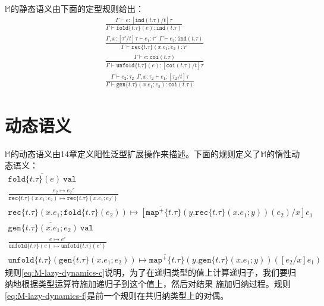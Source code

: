 $\mathbb{M}$的静态语义由下面的定型规则给出：
\begin{subequations}\label{eq:M-lazy-statcis}
	\begin{gather}
	\frac{\Gamma\vdash e:[\texttt{ind}(t.\tau)/t]\tau}{\Gamma\vdash\texttt{fold}\{t.\tau\}(e):\texttt{ind}(t.\tau)} \\
	\frac{\Gamma,x:[\tau'/t]\tau\vdash e_1:\tau'\ \ \Gamma\vdash e_2:\texttt{ind}(t.\tau)}
	{\Gamma\vdash\texttt{rec}\{t.\tau\}(x.e_1;e_2):\tau'} \\
	\frac{\Gamma\vdash e:\texttt{coi}(t.\tau)}{\Gamma\vdash\texttt{unfold}\{t.\tau\}(e):[\texttt{coi}(t.\tau)/t]\tau} \\
	\frac{\Gamma\vdash e_2:\tau_2\ \ \Gamma,x:\tau_2\vdash e_1:[\tau_2/t]\tau}
	{\Gamma\vdash\texttt{gen}\{t.\tau\}(x.e_1;e_2):\texttt{coi}(t.\tau)}
	\end{gather}
\end{subequations}

\section{动态语义}

$\mathbb{M}$的动态语义由14章定义阳性泛型扩展操作来描述。下面的规则定义了$\mathbb{M}$的惰性动态语义：
\begin{subequations} \label{eq:M-lazy-dynamics}
	\begin{gather}
	\overline{\texttt{fold}\{t.\tau\}(e)\ \texttt{val}}\label{eq:M-lazy-dynamics-a} \\
	\frac{e_2\mapsto e_2'}{\texttt{rec}\{t.\tau\}(x.e_1;e_2)\mapsto\texttt{rec}\{t.\tau\}(x.e_1;e_2')}\label{eq:M-lazy-dynamics-b} \\
	\overline{\texttt{rec}\{t.\tau\}(x.e_1;\texttt{fold}\{t.\tau\}(e_2))\mapsto
	[\texttt{map}^+\{t.\tau\}(y.\texttt{rec}\{t.\tau\}(x.e_1;y))(e_2)/x]e_1}\label{eq:M-lazy-dynamics-c} \\
	\overline{\texttt{gen}\{t.\tau\}(x.e_1;e_2)\ \texttt{val}}\label{eq:M-lazy-dynamics-d} \\
	\frac{e\mapsto e'}{\texttt{unfold}\{t.\tau\}(e)\mapsto\texttt{unfold}\{t.\tau\}(e')}\label{eq:M-lazy-dynamics-e} \\
	\overline{\texttt{unfold}\{t.\tau\}(\texttt{gen}\{t.\tau\}(x.e_1;e_2))\mapsto
	\texttt{map}^+\{t.\tau\}(y.\texttt{gen}\{t.\tau\}(x.e_1;y))([e_2/x]e_1)} \label{eq:M-lazy-dynamics-f}
	\end{gather}
\end{subequations}
规则\ref{eq:M-lazy-dynamics-c}说明，为了在递归类型的值上计算递归子，我们要归纳地根据类型运算符施加递归子到这个值上，然后对结果
施加归纳过程。规则\ref{eq:M-lazy-dynamics-f}是前一个规则在共归纳类型上的对偶。

